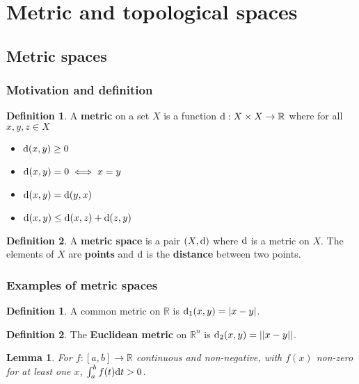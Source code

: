 \documentclass[12pt]{article}
\newtheorem{lem}[thm]{Lemma}
\theoremstyle{definition}
\newtheorem{defn}{Definition}[section]
\newtheorem*{defn*}{Definition}
\renewcommand{\d}{{\textnormal{d}}}
\begin{document}
\section{Metric and topological spaces}

\subsection{Metric spaces}

\subsubsection{Motivation and definition}

\begin{defn}
	A \textbf{metric} on a set $X$ is a function $\d : X \times X \to \mathbb{R}$ where for all $x, y, z \in X$
	\begin{itemize}
		\item $\d(x, y) \geq 0$
		\item $\d(x, y) = 0 \iff x = y$
		\item $\d(x, y) = \d(y, x)$
		\item $\d(x, y) \leq \d(x, z) + \d(z, y)$
	\end{itemize}
\end{defn}

\begin{defn}
	A \textbf{metric space} is a pair $(X, \d)$ where $\d$ is a metric on $X$.
	The elements of $X$ are \textbf{points} and $\d$ is the \textbf{distance} between two points.
\end{defn}

\subsubsection{Examples of metric spaces}

\begin{defn*}
	A common metric on $\mathbb{R}$ is $\d_1(x, y) = \lvert x - y \rvert$.
\end{defn*}

\begin{defn*}
	The \textbf{Euclidean metric} on $\mathbb{R}^n$ is $\d_2(x, y) = \lvert\lvert x - y \rvert\rvert$.
\end{defn*}

\begin{lem}
	For $f : [a, b] \to \mathbb{R}$ continuous and non-negative, with $f(x)$ non-zero for at least one $x$, $\int_a^bf(t)\d t > 0$.
\end{lem}
\end{document}
